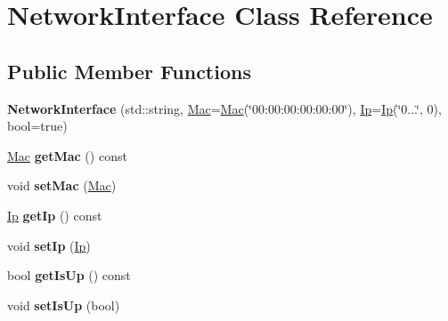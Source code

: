 \hypertarget{class_network_interface}{\section{Network\-Interface Class Reference}
\label{class_network_interface}
}
\subsection*{Public Member Functions}
\begin{DoxyCompactItemize}
\item 
\hypertarget{class_network_interface_a175876a0008316d0dc8f9f5c30836425}{{\bfseries Network\-Interface} (std\-::string, \hyperlink{class_mac}{Mac}=\hyperlink{class_mac}{Mac}(\char`\"{}00\-:00\-:00\-:00\-:00\-:00\char`\"{}), \hyperlink{class_ip}{Ip}=\hyperlink{class_ip}{Ip}(\char`\"{}0...\char`\"{}, 0), bool=true)}\label{class_network_interface_a175876a0008316d0dc8f9f5c30836425}

\item 
\hypertarget{class_network_interface_aa7bdfce922669b7dfd55861ef068c62c}{\hyperlink{class_mac}{Mac} {\bfseries get\-Mac} () const }\label{class_network_interface_aa7bdfce922669b7dfd55861ef068c62c}

\item 
\hypertarget{class_network_interface_a0469eb6d63b16dfc9f9cd9a21dd05133}{void {\bfseries set\-Mac} (\hyperlink{class_mac}{Mac})}\label{class_network_interface_a0469eb6d63b16dfc9f9cd9a21dd05133}

\item 
\hypertarget{class_network_interface_ae1f764cc8d2e26a0049065ca76a0a82b}{\hyperlink{class_ip}{Ip} {\bfseries get\-Ip} () const }\label{class_network_interface_ae1f764cc8d2e26a0049065ca76a0a82b}

\item 
\hypertarget{class_network_interface_a4dd85aba57cfd68d78973e6d34f1ec9f}{void {\bfseries set\-Ip} (\hyperlink{class_ip}{Ip})}\label{class_network_interface_a4dd85aba57cfd68d78973e6d34f1ec9f}

\item 
\hypertarget{class_network_interface_a4b1958560528988123737cbeeb32efb6}{bool {\bfseries get\-Is\-Up} () const }\label{class_network_interface_a4b1958560528988123737cbeeb32efb6}

\item 
\hypertarget{class_network_interface_a41608db3ba6211d1460c2207f236ce3c}{void {\bfseries set\-Is\-Up} (bool)}\label{class_network_interface_a41608db3ba6211d1460c2207f236ce3c}


\end{DoxyCompactItemize}
